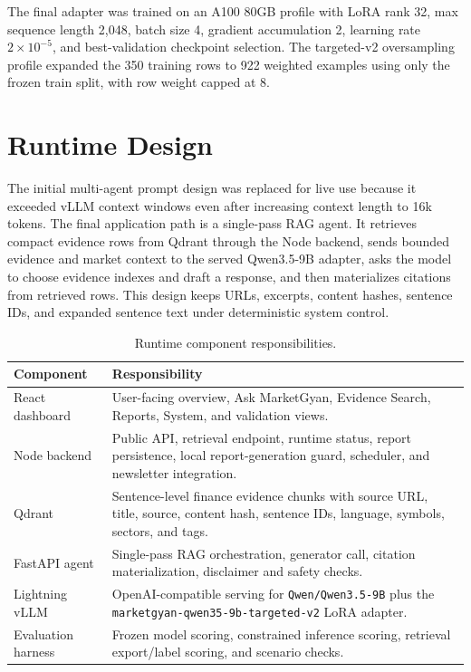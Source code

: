 \documentclass[12pt,a4paper]{report}
\begin{document}
The final adapter was trained on an A100 80GB profile with LoRA rank 32, max sequence length 2,048, batch size 4, gradient accumulation 2, learning rate \(2 \times 10^{-5}\), and best-validation checkpoint selection. The targeted-v2 oversampling profile expanded the 350 training rows to 922 weighted examples using only the frozen train split, with row weight capped at 8.

\section{Runtime Design}
The initial multi-agent prompt design was replaced for live use because it exceeded vLLM context windows even after increasing context length to 16k tokens. The final application path is a single-pass RAG agent. It retrieves compact evidence rows from Qdrant through the Node backend, sends bounded evidence and market context to the served Qwen3.5-9B adapter, asks the model to choose evidence indexes and draft a response, and then materializes citations from retrieved rows. This design keeps URLs, excerpts, content hashes, sentence IDs, and expanded sentence text under deterministic system control.

\begin{table}[htbp]
\centering
\caption{Runtime component responsibilities.}
\label{tab:runtime-design}
\small
\begin{tabularx}{\textwidth}{@{}L{0.28\textwidth}Y@{}}
\toprule
Component & Responsibility \\
\midrule
React dashboard & User-facing overview, Ask MarketGyan, Evidence Search, Reports, System, and validation views. \\
Node backend & Public API, retrieval endpoint, runtime status, report persistence, local report-generation guard, scheduler, and newsletter integration. \\
Qdrant & Sentence-level finance evidence chunks with source URL, title, source, content hash, sentence IDs, language, symbols, sectors, and tags. \\
FastAPI agent & Single-pass RAG orchestration, generator call, citation materialization, disclaimer and safety checks. \\
Lightning vLLM & OpenAI-compatible serving for \texttt{Qwen/Qwen3.5-9B} plus the \texttt{marketgyan-qwen35-9b-targeted-v2} LoRA adapter. \\
Evaluation harness & Frozen model scoring, constrained inference scoring, retrieval export/label scoring, and scenario checks. \\
\bottomrule
\end{tabularx}
\end{table}
\end{document}
